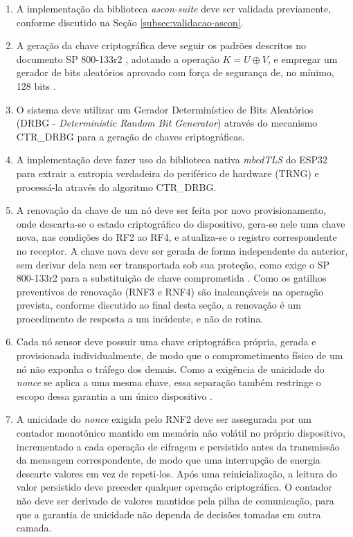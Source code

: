 \begin{enumerate}
    \item[RF1.] A implementação da biblioteca \textit{ascon-suite} deve ser validada previamente, conforme discutido na Seção \ref{subsec:validacao-ascon}.

    \item[RF2.] A geração da chave criptográfica deve seguir os padrões descritos no documento SP 800-133r2 \cite{barker2020nist133}, adotando a operação $K = U \oplus V$, e empregar um gerador de bits aleatórios aprovado com força de segurança de, no mínimo, 128 bits \cite{nist800232}.

    \item[RF3.] O sistema deve utilizar um Gerador Determinístico de Bits Aleatórios (DRBG - \textit{Deterministic Random Bit Generator}) através do mecanismo CTR\_DRBG para a geração de chaves criptográficas.

    \item[RF4.] A implementação deve fazer uso da biblioteca nativa \textit{mbedTLS} do ESP32 para extrair a entropia verdadeira do periférico de hardware (TRNG) e processá-la através do algoritmo CTR\_DRBG.

    \item[RF5.] A renovação da chave de um nó deve ser feita por novo provisionamento, onde descarta-se o estado criptográfico do dispositivo, gera-se nele uma chave nova, nas condições do RF2 ao RF4, e atualiza-se o registro correspondente no receptor. A chave nova deve ser gerada de forma independente da anterior, sem derivar dela nem ser transportada sob sua proteção, como exige o SP 800-133r2 para a substituição de chave comprometida \cite{barker2020nist133}. Como os gatilhos preventivos de renovação (RNF3 e RNF4) são inalcançáveis na operação prevista, conforme discutido ao final desta seção, a renovação é um procedimento de resposta a um incidente, e não de rotina.

    \item[RF6.] Cada nó sensor deve possuir uma chave criptográfica própria, gerada e provisionada individualmente, de modo que o comprometimento físico de um nó não exponha o tráfego dos demais. Como a exigência de unicidade do \textit{nonce} se aplica a uma mesma chave, essa separação também restringe o escopo dessa garantia a um único dispositivo \cite{nist800232}.

    \item[RF7.] A unicidade do \textit{nonce} exigida pelo RNF2 deve ser assegurada por um contador monotônico mantido em memória não volátil no próprio dispositivo, incrementado a cada operação de cifragem e persistido antes da transmissão da mensagem correspondente, de modo que uma interrupção de energia descarte valores em vez de repeti-los. Após uma reinicialização, a leitura do valor persistido deve preceder qualquer operação criptográfica. O contador não deve ser derivado de valores mantidos pela pilha de comunicação, para que a garantia de unicidade não dependa de decisões tomadas em outra camada.


\end{enumerate}
